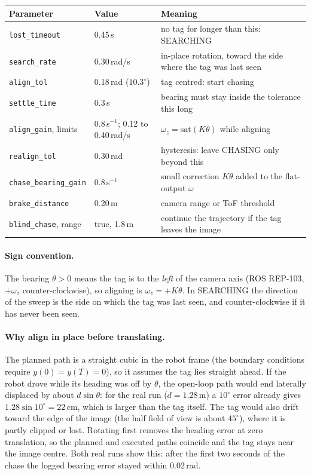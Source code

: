 \documentclass[11pt,a4paper]{article}
\begin{document}
\begin{center}\small
\begin{tabular}{@{}ll>{\raggedright\arraybackslash}p{7.8cm}@{}}
\toprule
\textbf{Parameter} & \textbf{Value} & \textbf{Meaning}\\
\midrule
\texttt{lost\_timeout} & 0.45\,s & no tag for longer than this: SEARCHING\\
\texttt{search\_rate} & 0.30\,rad/s & in-place rotation, toward the side where the tag was last seen\\
\texttt{align\_tol} & 0.18\,rad ($10.3^\circ$) & tag centred: start chasing\\
\texttt{settle\_time} & 0.3\,s & bearing must stay inside the tolerance this long\\
\texttt{align\_gain}, limits & 0.8\,s$^{-1}$; 0.12 to 0.40\,rad/s & $\omega_z=\mathrm{sat}(K\theta)$ while aligning\\
\texttt{realign\_tol} & 0.30\,rad & hysteresis: leave CHASING only beyond this\\
\texttt{chase\_bearing\_gain} & 0.8\,s$^{-1}$ & small correction $K\theta$ added to the flat-output $\omega$\\
\texttt{brake\_distance} & 0.20\,m & camera range or ToF threshold\\
\texttt{blind\_chase}, range & true, 1.8\,m & continue the trajectory if the tag leaves the image\\
\bottomrule
\end{tabular}
\end{center}
\paragraph{Sign convention.} The bearing $\theta>0$ means the tag is to the \emph{left} of the camera axis (ROS REP-103, $+\omega_z$ counter-clockwise), so aligning is $\omega_z=+K\theta$. In SEARCHING the direction of the sweep is the side on which the tag was last seen, and counter-clockwise if it has never been seen.

\paragraph{Why align in place before translating.} The planned path is a straight cubic in the robot frame (the boundary conditions require $y(0)=y(T)=0$), so it assumes the tag lies straight ahead. If the robot drove while its heading was off by $\theta$, the open-loop path would end laterally displaced by about $d\sin\theta$: for the real run ($d=1.28$\,m) a $10^\circ$ error already gives $1.28\sin10^\circ=22$\,cm, which is larger than the tag itself. The tag would also drift toward the edge of the image (the half field of view is about $45^\circ$), where it is partly clipped or lost. Rotating first removes the heading error at zero translation, so the planned and executed paths coincide and the tag stays near the image centre. Both real runs show this: after the first two seconds of the chase the logged bearing error stayed within 0.02\,rad.
\end{document}
